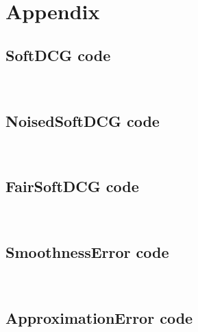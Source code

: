 \documentclass[14pt,a4paper]{amsart}
\theoremstyle{definition}
\theoremstyle{definition}
\begin{document}
\vspace{0.7cm}

\section*{Appendix}

\subsection*{SoftDCG code}


~\\

\subsection*{NoisedSoftDCG code}


~\\

\subsection*{FairSoftDCG code}


~\\

\subsection*{SmoothnessError code}


~\\

\subsection*{ApproximationError code}

\end{document}
